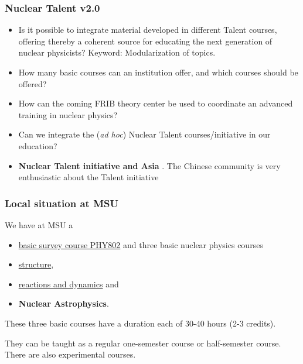 \documentclass{beamer}
\begin{document}
\begin{frame}
\frametitle{Nuclear Talent v2.0}

\begin{block}{}
\begin{itemize}
\item Is it possible to integrate material developed in different Talent courses, offering thereby a coherent source for educating the next generation of nuclear physicists? Keyword: Modularization of topics.

\item How many basic courses can an institution offer, and which courses should be offered?

\item How can the coming FRIB theory center be used to coordinate an advanced training in nuclear physics?

\item Can we integrate the (\emph{ad hoc}) Nuclear Talent courses/initiative  in our education? 

\item \textbf{Nuclear Talent initiative and Asia} . The Chinese community is very enthusiastic about the Talent initiative
\end{itemize}

\noindent
\end{block}
\end{frame}

\begin{frame}
\frametitle{Local situation at MSU}

\begin{block}{}

We have at MSU a  
\begin{itemize}
\item \href{{https://people.nscl.msu.edu/~witek/Classes/PHY802/NuclPhys802-2015.html}}{basic survey course PHY802}  and three basic nuclear physics courses 

\item \href{{http://nuclearstructure.github.io/PHY981/doc/web/course.html}}{structure}, 

\item \href{{https://people.nscl.msu.edu/~nunes/phy982/phy982web2015.htm}}{reactions and dynamics}  and 

\item \textbf{Nuclear Astrophysics}. 
\end{itemize}

\noindent
These three basic courses have a duration each  of 30-40 hours (2-3 credits).   

They can be taught as a regular one-semester course or half-semester course. There are also experimental courses.



\end{block}
\end{frame}
\end{document}
